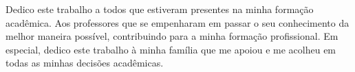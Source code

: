 Dedico este trabalho a todos que estiveram presentes na minha formação acadêmica. Aos professores que se empenharam em passar o seu conhecimento da melhor maneira possível, contribuindo para  a minha formação profissional. Em especial, dedico este trabalho à minha família que me apoiou e me acolheu em todas as minhas decisões acadêmicas.